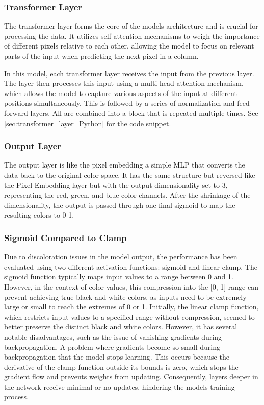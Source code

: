     \subsubsection{Transformer Layer}
    \label{sec:transformer_CIT}

    The transformer layer forms the core of the models architecture and is crucial for processing the data. It utilizes self-attention mechanisms \autocite{vaswani2023attention} to weigh the importance of different pixels relative to each other, allowing the model to focus on relevant parts of the input when predicting the next pixel in a column. 

    In this model, each transformer layer receives the input from the previous layer. The layer then processes this input using a multi-head attention mechanism, which allows the model to capture various aspects of the input at different positions simultaneously. This is followed by a series of normalization and feed-forward layers. All are combined into a block that is repeated multiple times. See \autoref{sec:transformer_layer_Python} for the code snippet.


    \subsubsection{Output Layer}

    The output layer is like the pixel embedding a simple MLP that converts the data back to the original color space. It has the same structure but reversed like the Pixel Embedding layer but with the output dimensionality set to \(3\), representing the red, green, and blue color channels. After the shrinkage of the dimensionality, the output is passed through one final sigmoid to map the resulting colors to 0-1.

    \subsubsection{Sigmoid Compared to Clamp}
    \label{sec:sigmoid_vs_clamp}
    
    Due to discoloration issues in the model output, the performance has been evaluated using two different activation functions: sigmoid and linear clamp. The sigmoid function typically maps input values to a range between 0 and 1. However, in the context of color values, this compression into the [0, 1] range can prevent achieving true black and white colors, as inputs need to be extremely large or small to reach the extremes of 0 or 1. Initially, the linear clamp function, which restricts input values to a specified range without compression, seemed to better preserve the distinct black and white colors. However, it has several notable disadvantages, such as the issue of vanishing gradients during backpropagation. A problem where gradients become so small during backpropagation that the model stops learning. This occurs because the derivative of the clamp function outside its bounds is zero, which stops the gradient flow and prevents weights from updating. Consequently, layers deeper in the network receive minimal or no updates, hindering the models training process.
    
